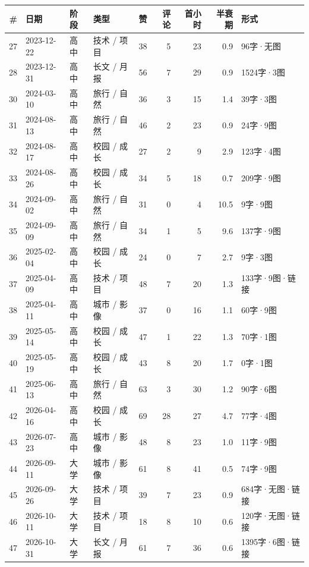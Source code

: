 \footnotesize
\begin{longtable}{@{}r l l p{2.1cm} r r r r p{2.5cm}@{}}
\toprule
\# & 日期 & 阶段 & 类型 & 赞 & 评论 & 首小时 & 半衰期 & 形式 \\
\midrule

27 & 2023-12-22 & 高中 & 技术 / 项目 & 38 & 5 & 23 & 0.9 & 96字·无图 \\
28 & 2023-12-31 & 高中 & 长文 / 月报 & 56 & 7 & 29 & 0.9 & 1524字·3图 \\
30 & 2024-03-10 & 高中 & 旅行 / 自然 & 36 & 3 & 15 & 1.4 & 39字·3图 \\
31 & 2024-08-13 & 高中 & 旅行 / 自然 & 46 & 2 & 23 & 0.9 & 24字·9图 \\
32 & 2024-08-17 & 高中 & 校园 / 成长 & 27 & 2 & 9 & 2.9 & 123字·4图 \\
33 & 2024-08-26 & 高中 & 校园 / 成长 & 34 & 5 & 18 & 0.7 & 209字·9图 \\
34 & 2024-09-02 & 高中 & 旅行 / 自然 & 31 & 0 & 4 & 10.5 & 9字·9图 \\
35 & 2024-09-09 & 高中 & 旅行 / 自然 & 34 & 1 & 5 & 9.6 & 137字·9图 \\
36 & 2025-02-04 & 高中 & 校园 / 成长 & 24 & 0 & 7 & 2.7 & 9字·3图 \\
37 & 2025-04-09 & 高中 & 技术 / 项目 & 48 & 7 & 20 & 1.3 & 133字·9图·链接 \\
38 & 2025-04-11 & 高中 & 城市 / 影像 & 37 & 0 & 16 & 1.1 & 60字·9图 \\
39 & 2025-05-14 & 高中 & 校园 / 成长 & 47 & 1 & 22 & 1.3 & 70字·1图 \\
40 & 2025-05-19 & 高中 & 校园 / 成长 & 43 & 8 & 20 & 1.7 & 0字·1图 \\
41 & 2025-06-13 & 高中 & 旅行 / 自然 & 63 & 3 & 30 & 1.2 & 90字·6图 \\
42 & 2026-04-16 & 高中 & 校园 / 成长 & 69 & 28 & 27 & 4.7 & 77字·4图 \\
43 & 2026-07-23 & 高中 & 城市 / 影像 & 48 & 8 & 23 & 1.0 & 11字·9图 \\
44 & 2026-09-11 & 大学 & 城市 / 影像 & 61 & 8 & 41 & 0.5 & 74字·9图 \\
45 & 2026-09-26 & 大学 & 技术 / 项目 & 39 & 7 & 23 & 0.9 & 684字·无图·链接 \\
46 & 2026-10-11 & 大学 & 技术 / 项目 & 18 & 8 & 10 & 0.6 & 120字·无图·链接 \\
47 & 2026-10-31 & 大学 & 长文 / 月报 & 61 & 7 & 36 & 0.6 & 1395字·6图·链接 \\
\bottomrule
\end{longtable}
\normalsize

